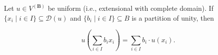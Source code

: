 Let $u \in V^{(\mathbf{B})}$ be uniform (i.e., extensional with complete domain). If $\{x_i \mid i \in I\} \subseteq \mathcal{D}(u)$ and $\{b_i \mid i \in I\} \subseteq B$ is a partition of unity, then

$$u\left(\sum_{i \in I} b_i x_i\right) = \sum_{i \in I} b_i \cdot u(x_i).$$
